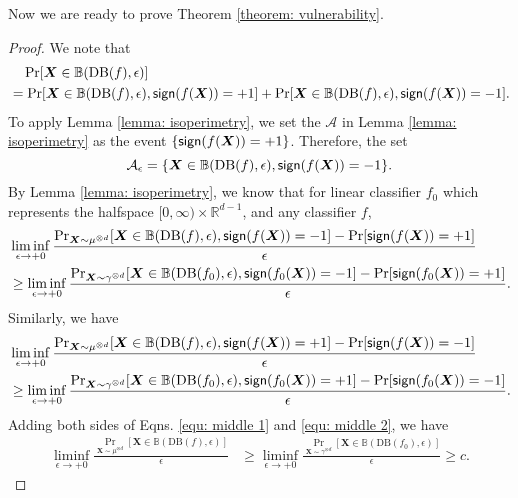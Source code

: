 \documentclass[11pt]{article}
\newcommand{\sign}{\textup{\textsf{sign}}}
\newcommand{\boundary}{\mathrm{DB}}
\newcommand{\R}{\mathbb{R}}
\newcommand{\X}{\bm{X}}
\newcommand{\0}{\mathbf{0}}
\newcommand{\1}{\mathbf{1}}
\newcommand{\cA}{\mathcal{A}}
\newcommand{\bbB}{\mathbb{B}}
\begin{document}
Now we are ready to prove Theorem \ref{theorem: vulnerability}.


\begin{proof}
We note that
\begin{equation*}
\begin{split}
&\quad\Pr[\X\in\bbB(\boundary(f),\epsilon)]\\
&=\Pr[\X\in\bbB(\boundary(f),\epsilon),\sign(f(\X))=+1]+\Pr[\X\in\bbB(\boundary(f),\epsilon),\sign(f(\X))=-1].
\end{split}
\end{equation*}
To apply Lemma \ref{lemma: isoperimetry}, we set the $\cA$ in Lemma \ref{lemma: isoperimetry} as the event $\{\sign(f(\X))=+1\}$. Therefore, the set
\begin{equation*}
\cA_\epsilon=\{\X\in\bbB(\boundary(f),\epsilon),\sign(f(\X))=-1\}.
\end{equation*}
By Lemma \ref{lemma: isoperimetry}, we know that for linear classifier $f_0$ which represents the halfspace $[0,\infty)\times \R^{d-1}$, and any classifier $f$,
\begin{equation}
\label{equ: middle 1}
\begin{split}
&\liminf_{\epsilon\rightarrow+0} \frac{\Pr_{\X\sim \mu^{\otimes d}}[\X\in\bbB(\boundary(f),\epsilon),\sign(f(\X))=-1]-\Pr[\sign(f(\X))=+1]}{\epsilon}\\
&\ge \liminf_{\epsilon\rightarrow+0} \frac{\Pr_{\X\sim \gamma^{\otimes d}}[\X\in\bbB(\boundary(f_0),\epsilon),\sign(f_0(\X))=-1]-\Pr[\sign(f_0(\X))=+1]}{\epsilon}.
\end{split}
\end{equation}
Similarly, we have
\begin{equation}
\label{equ: middle 2}
\begin{split}
&\liminf_{\epsilon\rightarrow+0} \frac{\Pr_{\X\sim \mu^{\otimes d}}[\X\in\bbB(\boundary(f),\epsilon),\sign(f(\X))=+1]-\Pr[\sign(f(\X))=-1]}{\epsilon}\\
&\ge \liminf_{\epsilon\rightarrow+0} \frac{\Pr_{\X\sim \gamma^{\otimes d}}[\X\in\bbB(\boundary(f_0),\epsilon),\sign(f_0(\X))=+1]-\Pr[\sign(f_0(\X))=-1]}{\epsilon}.
\end{split}
\end{equation}
Adding both sides of Eqns. \eqref{equ: middle 1} and \eqref{equ: middle 2}, we have
\begin{equation*}
\begin{split}
\liminf_{\epsilon\rightarrow+0} \frac{\Pr_{\X\sim \mu^{\otimes d}}[\X\in\bbB(\boundary(f),\epsilon)]}{\epsilon}&\ge \liminf_{\epsilon\rightarrow+0} \frac{\Pr_{\X\sim \gamma^{\otimes d}}[\X\in\bbB(\boundary(f_0),\epsilon)]}{\epsilon}\ge c.
\end{split}
\end{equation*}
\end{proof}
\end{document}
